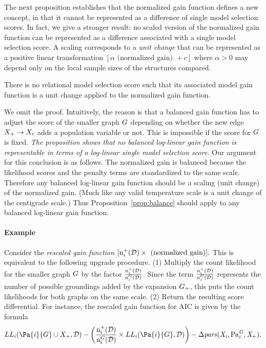 \documentclass[letterpaper]{article}
\begin{document}
%

The next proposition establishes that the normalized gain function defines a new concept, in that it cannot be represented as a difference of single  model selection scores. In fact, we give a stronger result: no scaled version of the normalized gain function can be represented as a difference associated with a single  model selection score. A scaling corresponds to a {\em unit change} that can be represented as a positive linear transformation $[\alpha \mbox{ (normalized gain) } + c]$ where $\alpha > 0$ may depend only on the local sample sizes of the structures compared. 

\begin{proposition} \label{prop:balance}
There is no relational model selection score such that its associated model gain function is a unit change applied to the normalized gain function.
\end{proposition}

We omit the proof. Intuitively, the reason is that a balanced gain function has to adjust the score of the smaller graph $G$ depending on whether the new edge $X_{+} \rightarrow X_{i}$ adds a population variable or not. This is impossible if the score for $G$ is fixed. {\em The proposition shows that no balanced log-linear gain function is representable in terms of a log-linear single model selection score.} Our argument for this conclusion is as follows. The normalized gain is balanced because the likelihood scores and the penalty terms are standardized to the same scale. Therefore any balanced log-linear gain function should be a scaling (unit change) of the normalized gain. (Much like any valid temperature scale is a unit change of the centigrade scale.) Thus Proposition~\ref{prop:balance} should apply to any balanced log-linear gain function. 

\paragraph{Example} Consider the {\em rescaled gain function} $[\mathrm{n}^{+}_{i}(\mathcal{D}) \times \mbox{ (normalized gain)}].$ This is equivalent to the following upgrade procedure. (1) Multiply the count likelihood for the smaller graph $G$ by the factor $\frac
	{\mathrm{n}^{+}_{i}(\mathcal{D})}
	{\mathrm{n}^{G}_{i}(\mathcal{D})}$. Since the term $\frac
	{\mathrm{n}^{+}_{i}(\mathcal{D})}
	{\mathrm{n}^{G}_{i}(\mathcal{D})}$ represents the number of possible groundings added by the expansion $G_{+}$, this puts the count likelihoods for both graphs on the same scale. 
	(2) Return the resulting score differential. For instance, the rescaled gain function for AIC is given by the formula
\scriptsize
	$$\score{\loglikelihood}{i}{\Pa{i}{\graph}\cup\node_{+}}{\dstructure} -
\left(\frac
	{\Fcount{+}{i}{\dstructure}}
	{\Fcount{\graph}{i}{\dstructure}} \times \score{\loglikelihood}{i}{\Pa{i}{\graph}}{\dstructure} \right) - \parloss{i}{\graph}.$$
	
\end{document}
